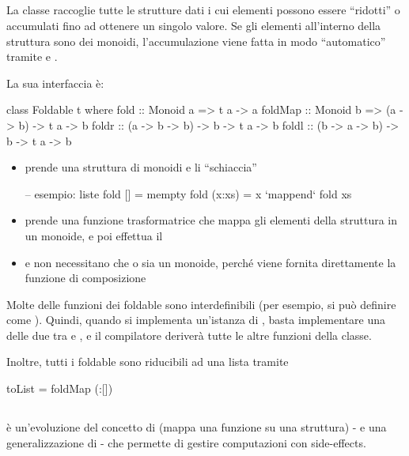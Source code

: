 \subsection{}
La classe  raccoglie tutte le strutture dati i cui elementi possono essere ``ridotti'' o accumulati fino ad ottenere un singolo valore. Se gli elementi all'interno della struttura sono dei monoidi, l'accumulazione viene fatta in modo ``automatico'' tramite  e .

La sua interfaccia è:
\begin{haskellbox}{}
class Foldable t where
    fold    :: Monoid a => t a -> a
    foldMap :: Monoid b => (a -> b) -> t a -> b
    foldr   :: (a -> b -> b) -> b -> t a -> b
    foldl   :: (b -> a -> b) -> b -> t a -> b
\end{haskellbox}
\begin{itemize}
    \item {} prende una struttura di monoidi e li ``schiaccia''
        \begin{haskellbox}{}
-- esempio: liste
fold [] = mempty
fold (x:xs) = x `mappend` fold xs
\end{haskellbox}

    \item {} prende una funzione trasformatrice che mappa gli elementi della struttura in un monoide, e poi effettua il 
    \item {} e  non necessitano che  o  sia un monoide, perché viene fornita direttamente la funzione di composizione
\end{itemize}

Molte delle funzioni dei foldable sono interdefinibili (per esempio,  si può definire come ). Quindi, quando si implementa un'istanza di , basta implementare una delle due tra  e , e il compilatore deriverà tutte le altre funzioni della classe.

Inoltre, tutti i foldable sono riducibili ad una lista tramite
\begin{haskellbox}{}
toList = foldMap (:[])
\end{haskellbox}

\subsection{}
 è un'evoluzione del concetto di  (mappa una funzione su una struttura) - e una generalizzazione di  - che permette di gestire computazioni con side-effects.

